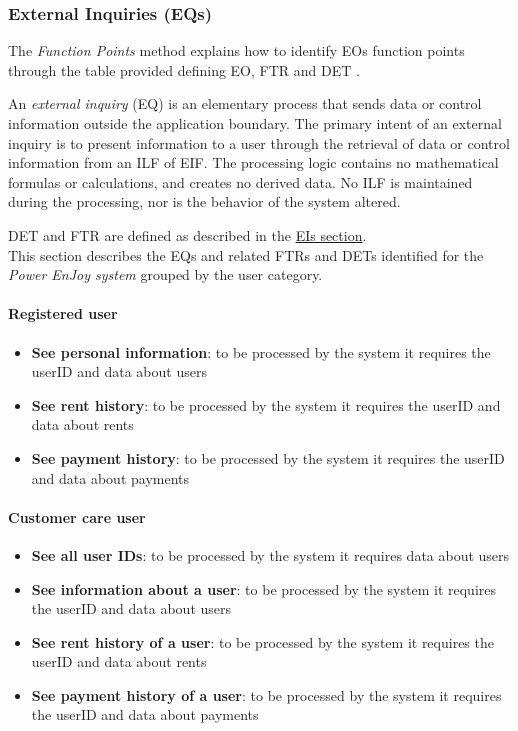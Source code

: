 \subsubsection{External Inquiries (EQs)}
The \emph{Function Points} method explains how to identify EOs function points through the table provided defining EO, FTR and DET \cite{FP}.

An \textit{external inquiry} (EQ) is an elementary process that sends data or control information outside the application boundary. The primary intent of an external inquiry is to present information to a user through the retrieval of data or control information from an ILF of EIF. The processing logic contains no mathematical formulas or calculations, and creates no derived data. No ILF is maintained during the processing, nor is the behavior of the system
altered.

DET and FTR are defined as described in the \hyperref[sec:EIs]{EIs section}.\\

This section describes the EQs and related FTRs and DETs identified for the \emph{Power EnJoy system} grouped by the user category.

\paragraph{Registered user}
\begin{itemize}
	\item \textbf{See personal information}: to be processed by the system it requires the userID and data about users
	\item \textbf{See rent history}: to be processed by the system it requires the userID and data about rents
	\item \textbf{See payment history}: to be processed by the system it requires the userID and data about payments
\end{itemize}

\paragraph{Customer care user}
\begin{itemize}
	\item \textbf{See all user IDs}:  to be processed by the system it requires data about users
	\item \textbf{See information about a user}: to be processed by the system it requires the userID and data about users
	\item \textbf{See rent history of a user}: to be processed by the system it requires the userID and data about rents
	\item \textbf{See payment history of a user}: to be processed by the system it requires the userID and data about payments
\end{itemize}

